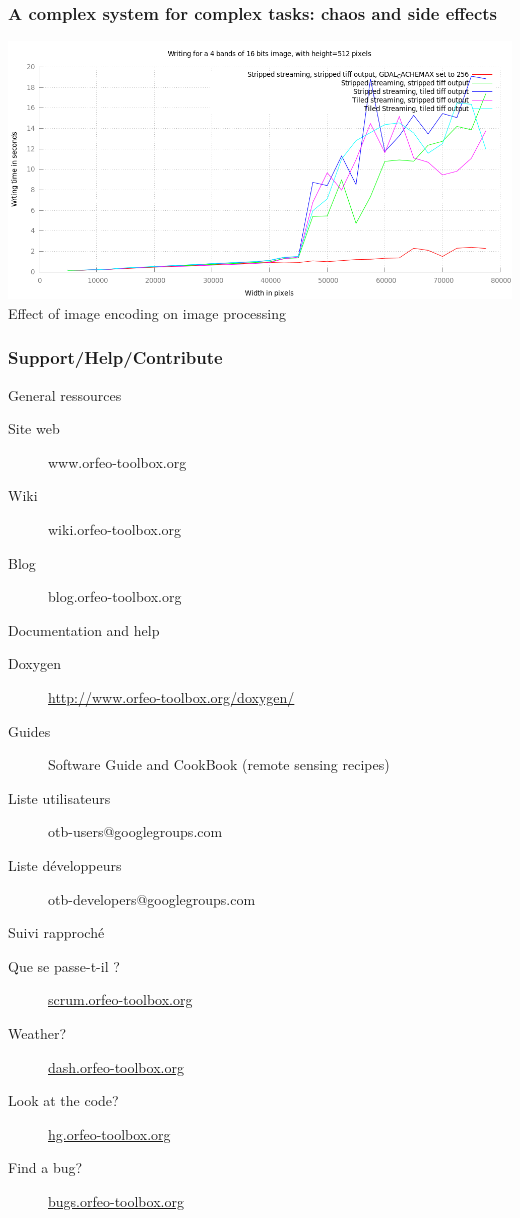 \documentclass[8pt]{beamer}
\begin{document}
\begin{frame}
\frametitle{A complex system for complex tasks: chaos and side effects}
\begin{center}
\includegraphics[width=\textwidth]{images/Writing.png}\\
\tiny{Effect of image encoding on image processing}
\end{center}
\end{frame}

\begin{frame}
\frametitle{Support/Help/Contribute}
\vspace{-0.2cm}
\begin{block}{General ressources}
\vspace{-0.2cm}
\begin{description}
\item[Site web] www.orfeo-toolbox.org
\item[Wiki] wiki.orfeo-toolbox.org
\item[Blog] blog.orfeo-toolbox.org
\end{description}
\end{block}
\vspace{-0.2cm}
\begin{block}{Documentation and help}
\vspace{-0.2cm}
\begin{description}
\item[Doxygen] \url{http://www.orfeo-toolbox.org/doxygen/}
\item[Guides] Software Guide and CookBook (remote sensing recipes)
\item[Liste utilisateurs] otb-users@googlegroups.com
\item[Liste développeurs] otb-developers@googlegroups.com
\end{description}
\end{block}
\vspace{-0.2cm}
\begin{block}{Suivi rapproché}
\vspace{-0.2cm}
\begin{description}
\item[Que se passe-t-il ?] \url{scrum.orfeo-toolbox.org}
\item[Weather?] \url{dash.orfeo-toolbox.org}
\item[Look at the code?] \url{hg.orfeo-toolbox.org}
\item[Find a bug?] \url{bugs.orfeo-toolbox.org}
\end{description}
\end{block}
\end{frame}
\end{document}
